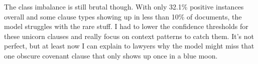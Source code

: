 The class imbalance is still brutal though. With only 32.1\% positive instances overall and some clause types showing up in less than 10\% of documents, the model struggles with the rare stuff. I had to lower the confidence thresholds for these unicorn clauses and really focus on context patterns to catch them. It's not perfect, but at least now I can explain to lawyers why the model might miss that one obscure covenant clause that only shows up once in a blue moon.